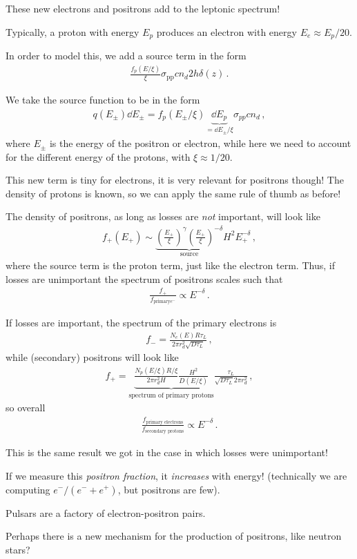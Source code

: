 \documentclass[main.tex]{subfiles}
\begin{document}
These new electrons and positrons add to the leptonic spectrum! 

Typically, a proton with energy \(E_p\) produces an electron with energy \(E_e \approx E_p / 20\). 

In order to model this, we add a source term in the form 
%
\begin{align}
\frac{f_p (E / \xi )}{\xi } \sigma _{\text{pp}} c n_d 2 h \delta (z)
\,.
\end{align}

We take the source function to be in the form 
%
\begin{align}
q(E_{\pm } ) \dd{E_{ \pm}} =  f_p( E_{\pm} / \xi ) \underbrace{\dd{E_p}}_{= \dd{E_{\pm}} / \xi } \sigma _{pp} c n_d
\,,
\end{align}
%
where \(E_{\pm}\) is the energy of the positron or electron, while here we need to account for the different energy of the protons, with \(\xi \approx 1/20\). 

This new term is tiny for electrons, it is very relevant for positrons though! 
The density of protons is known, so we can apply the same rule of thumb as before! 

The density of positrons, as long as losses are \emph{not} important, will look like 
%
\begin{align}
f_+ (E_+) \sim \underbrace{\left(\frac{E_+}{\xi  }\right)^{\gamma } \left(\frac{E_+}{\xi }\right)^{-\delta }}_{\text{source}} H^2 E_+^{-\delta }
\,,
\end{align}
%
where the source term is the proton term, just like the electron term. 
Thus, if losses are unimportant the spectrum of positrons scales such that 
%
\begin{align}
\frac{f_+}{f _{\text{primary} e^-}} \propto E^{-\delta }
\,.
\end{align}

If losses are important, the spectrum of the primary electrons is 
%
\begin{align}
f_- = \frac{N_e (E) R \tau _L}{2 \pi r_d^2 \sqrt{D \tau _L}} 
\,,
\end{align}
%
while (secondary) positrons will look like 
%
\begin{align}
f_+ = \underbrace{\frac{N_p (E /\xi ) R /\xi }{2 \pi r_d^2 H} \frac{H^2}{D(E / \xi )}}_{\text{spectrum of primary protons}} \frac{\tau _L}{\sqrt{D \tau _L} 2 \pi r_d^2} 
\,,
\end{align}
%
so overall 
%
\begin{align}
\frac{f _{\text{primary electrons}}}{f _{\text{secondary protons}}} 
\propto E^{- \delta }
\,.
\end{align}

This is the same result we got in the case in which losses were unimportant! 

If we measure this \emph{positron fraction}, it \emph{increases} with energy! 
(technically we are computing \(e^- / (e^- + e^+)\), but positrons are few). 

Pulsars are a factory of electron-positron pairs. 

Perhaps there is a new mechanism for the production of positrons, like neutron stars? 
\end{document}
